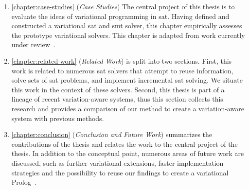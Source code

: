 \begin{enumerate}
  \item \autoref{chapter:case-studies} (\emph{Case Studies}) The central project
    of this thesis is to evaluate the ideas of variational programming in
    \acl{sat}. Having defined and constructed a variational \ac{sat} and
    \ac{smt} solver, this chapter empirically assesses the prototype variational
    solvers. This chapter is adapted from work currently under
    review~\cite{VSATJournal}.

  \item \autoref{chapter:related-work} (\emph{Related Work}) is split into two
    sections. First, this work is related to numerous \ac{sat} solvers that
    attempt to reuse information, solve sets of \ac{sat} problems, and implement
    incremental \ac{sat} solving. We situate this work in the context of these
    solvers. Second, this thesis is part of a lineage of recent variation-aware
    systems, thus this section collects this research and provides a comparison
    of our method to create a variation-aware system with previous methods.

  \item \autoref{chapter:conclusion} (\emph{Conclusion and Future Work})
    summarizes the contributions of the thesis and relates the work to the
    central project of the thesis. In addition to the conceptual point, numerous
    areas of future work are discussed, such as further variational extensions,
    faster implementation strategies and the possibility to reuse our findings
    to create a variational
    Prolog~\cite{wielemaker:2011:tplp,EarlyLogicProgramming}.
  \end{enumerate}



